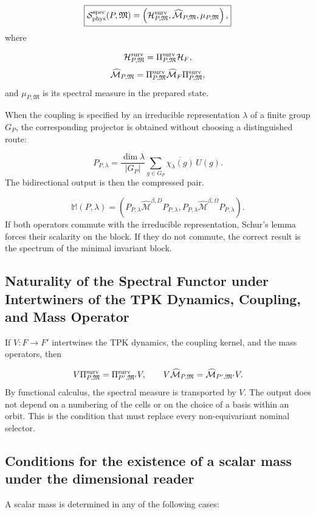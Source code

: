 \[
 \boxed{
 \mathcal S_{\rm phys}^{\rm spec}(P,\mathfrak M)
 =\left(
 \mathcal H_{P,\mathfrak M}^{\rm surv},
 \widehat{\mathcal M}_{P,\mathfrak M},
 \mu_{P,\mathfrak M}
 \right),}
\]
where

\[
 \mathcal H_{P,\mathfrak M}^{\rm surv}
 =\Pi_{P,\mathfrak M}^{\rm surv}\mathcal H_F,
\]
\[
 \widehat{\mathcal M}_{P,\mathfrak M}
 =\Pi_{P,\mathfrak M}^{\rm surv}
  \widehat{\mathcal M}_F
  \Pi_{P,\mathfrak M}^{\rm surv},
\]
and \(\mu_{P,\mathfrak M}\) is its spectral measure in the prepared state.

When the coupling is specified by an irreducible representation \(\lambda\) of a finite group \(G_P\), the corresponding projector is obtained without choosing a distinguished route:

\[
 P_{P,\lambda}
 =\frac{\dim\lambda}{|G_P|}
  \sum_{g\in G_P}\overline{\chi_\lambda(g)}\,U(g).
\]
The bidirectional output is then the compressed pair.

\[
 \mathbb M(P,\lambda)=
 \left(
 P_{P,\lambda}\widehat{\mathcal M}^{\beta,D}P_{P,\lambda},
 P_{P,\lambda}\widehat{\mathcal M}^{\beta,\Omega}P_{P,\lambda}
 \right).
\]
If both operators commute with the irreducible representation, Schur's lemma forces their scalarity on the block. If they do not commute, the correct result is the spectrum of the minimal invariant block.

\subsection{Naturality of the Spectral Functor under Intertwiners of the TPK Dynamics, Coupling, and Mass Operator}
If \(V:F\to F'\) intertwines the TPK dynamics, the coupling kernel, and the mass operators, then

\[
 V\Pi_{P,\mathfrak M}^{\rm surv}
 =\Pi_{P',\mathfrak M'}^{\rm surv}V,
 \qquad
 V\widehat{\mathcal M}_{P,\mathfrak M}
 =\widehat{\mathcal M}_{P',\mathfrak M'}V.
\]
By functional calculus, the spectral measure is transported by \(V\). The output does not depend on a numbering of the cells or on the choice of a basis within an orbit. This is the condition that must replace every non-equivariant nominal selector.

\subsection{Conditions for the existence of a scalar mass under the dimensional reader}
A scalar mass is determined in any of the following cases:

